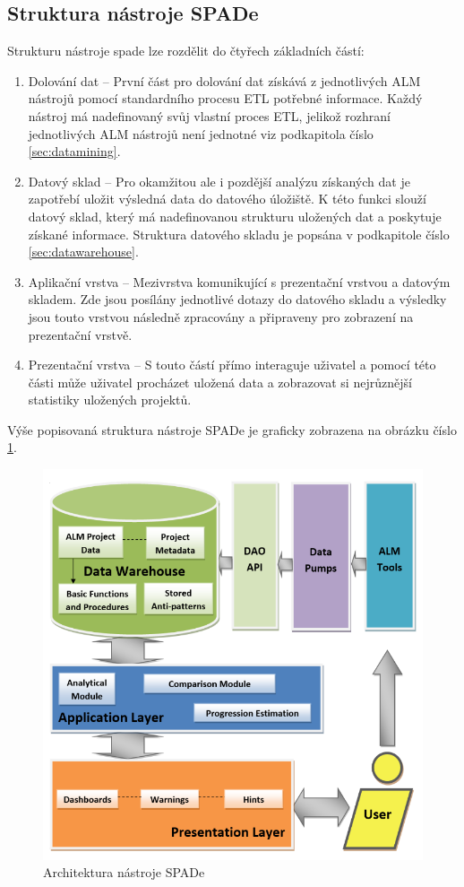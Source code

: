 \documentclass[czech,DP]{thesiskiv}
\begin{document}
\subsection{Struktura nástroje SPADe}\label{sec:spade_struc}
Strukturu nástroje spade lze rozdělit do čtyřech základních částí:
\begin{enumerate}
    \item Dolování dat -- První část pro dolování dat získává z jednotlivých ALM nástrojů pomocí standardního procesu ETL potřebné informace. Každý nástroj má nadefinovaný svůj vlastní proces ETL, jelikož rozhraní jednotlivých ALM nástrojů není jednotné viz podkapitola číslo \ref{sec:datamining}.
    \item Datový sklad -- Pro okamžitou ale i pozdější analýzu získaných dat je zapotřebí uložit výsledná data do datového úložiště. K této funkci slouží datový sklad, který má nadefinovanou strukturu uložených dat a poskytuje získané informace. Struktura datového skladu je popsána v podkapitole číslo \ref{sec:datawarehouse}.
    \item Aplikační vrstva -- Mezivrstva komunikující s prezentační vrstvou a datovým skladem. Zde jsou posílány jednotlivé dotazy do datového skladu a výsledky jsou touto vrstvou následně zpracovány a připraveny pro zobrazení na prezentační vrstvě.
    \item Prezentační vrstva -- S touto částí přímo interaguje uživatel a pomocí této části může uživatel procházet uložená data a zobrazovat si nejrůznější statistiky uložených projektů.
\end{enumerate}
Výše popisovaná struktura nástroje SPADe je graficky zobrazena na obrázku číslo \ref{img:spade_arch}.

\begin{figure}[!htb]
    \centering
    \includegraphics[width=\textwidth]{img/SPADE_arch.png}
    \caption{Architektura nástroje SPADe \cite{picha}}
    \label{img:spade_arch}
\end{figure}
\FloatBarrier
\end{document}
